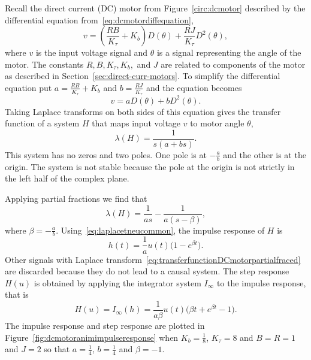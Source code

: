 Recall the direct current (DC) motor from Figure~\ref{circ:dcmotor} described by the differential equation from~\eqref{eq:dcmotordiffequation},
\[
v = \left(\frac{RB}{K_\tau} + K_b\right) D(\theta) + \frac{RJ}{K_\tau} D^2(\theta),
\]
where $v$ is the input voltage signal and $\theta$ is a signal representing the angle of the motor.  The constants $R,B,K_\tau,K_b,$ and $J$ are related to components of the motor as described in Section~\ref{sec:direct-curr-motors}.  To simplify the differential equation put $a = \tfrac{RB}{K_\tau} + K_b$ and $b=\tfrac{RJ}{K_\tau}$ and the equation becomes
\[
v = a D(\theta) + b D^2(\theta).
\]
Taking Laplace transforms on both sides of this equation gives the transfer function of a system $H$ that maps input voltage $v$ to motor angle $\theta$,
\[
\lambda(H) = \frac{1}{s(a + bs)}.
\]
This system has no zeros and two poles.  One pole is at $-\tfrac{a}{b}$ and the other is at the origin.  The system is not stable because the pole at the origin is not strictly in the left half of the complex plane.

Applying partial fractions we find that
\begin{equation}\label{eq:transferfunctionDCmotorpartialfraced}
\lambda(H) = \frac{1}{as} - \frac{1}{a(s - \beta)},
\end{equation}
where $\beta = -\tfrac{a}{b}$.  Using~\eqref{eq:laplacetneucommon}, the impulse response of $H$ is
\begin{equation}\label{eq:impulseresponseDCmotor}
h(t) = \frac{1}{a}u(t)\big( 1  - e^{\beta t} \big).
\end{equation}
Other signals with Laplace transform~\eqref{eq:transferfunctionDCmotorpartialfraced} are discarded because they do not lead to a causal system.  The step response $H(u)$ is obtained by applying the integrator system $I_\infty$ to the impulse response, that is
\[
H(u) = I_\infty(h) = \frac{1}{a\beta}u(t) \big( \beta t + e^{\beta t} - 1 \big).
\]
The impulse response and step response are plotted in Figure~\ref{fig:dcmotoranimimpulseresponse} when $K_b= \tfrac{1}{8}$, $K_\tau = 8$ and $B=R=1$ and $J=2$ so that $a = \tfrac{1}{4}$, $b=\tfrac{1}{4}$ and $\beta = -1$.


